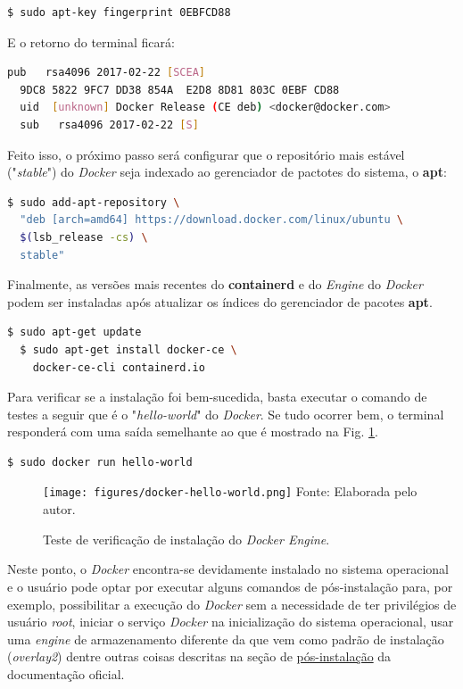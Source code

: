 \documentclass[
  12pt,				%
  openright,			%
  twoside,			%
  a4paper,			%
  english,			%
  french,				%
  spanish,			%
  brazil,				%
  ]{abntex2}
\begin{document}
\begin{lstlisting}[language=bash]
    $ sudo apt-key fingerprint 0EBFCD88
    \end{lstlisting}

E o retorno do terminal ficará:

\begin{lstlisting}[language=bash]
  pub   rsa4096 2017-02-22 [SCEA]
  9DC8 5822 9FC7 DD38 854A  E2D8 8D81 803C 0EBF CD88
  uid  [unknown] Docker Release (CE deb) <docker@docker.com>
  sub   rsa4096 2017-02-22 [S]
\end{lstlisting}

Feito isso, o próximo passo será configurar que o repositório mais estável ("\textit{stable}") do \textit{Docker} seja indexado ao gerenciador de
pactotes do sistema, o \textbf{apt}:

\begin{lstlisting}[language=bash]
  $ sudo add-apt-repository \
  "deb [arch=amd64] https://download.docker.com/linux/ubuntu \
  $(lsb_release -cs) \
  stable"
\end{lstlisting}


Finalmente, as versões mais recentes do \textbf{containerd} e do \textit{Engine} do \textit{Docker} podem ser instaladas após atualizar os índices do
gerenciador de pacotes \textbf{apt}.

\begin{lstlisting}[language=bash]
  $ sudo apt-get update
  $ sudo apt-get install docker-ce \
    docker-ce-cli containerd.io
\end{lstlisting}

Para verificar se a instalação foi bem-sucedida, basta executar o comando de testes a seguir que é o "\textit{hello-world}" do \textit{Docker}. Se tudo ocorrer bem,
o terminal responderá com uma saída semelhante ao que é mostrado na Fig. \ref{fig:docker-hello-world}.

\begin{lstlisting}[language=bash]
  $ sudo docker run hello-world
\end{lstlisting}

\begin{figure}[!htb]
  \centering
  \caption{Teste de verificação de instalação do \textit{Docker Engine}.}
  \texttt{[image: figures/docker-hello-world.png]}
  Fonte: Elaborada pelo autor.
  \label{fig:docker-hello-world}
\end{figure}

Neste ponto, o \textit{Docker} encontra-se devidamente instalado no sistema operacional e o usuário pode optar por executar alguns comandos de pós-instalação
para, por exemplo, possibilitar a execução do \textit{Docker} sem a necessidade de ter privilégios de usuário \textit{root}, iniciar o serviço \textit{Docker} na inicialização do
sistema operacional, usar uma \textit{engine} de armazenamento diferente da que vem como padrão de instalação (\textit{overlay2}) dentre outras coisas descritas
na seção de \href{https://docs.docker.com/engine/install/linux-postinstall/}{pós-instalação} da documentação oficial.
\end{document}
